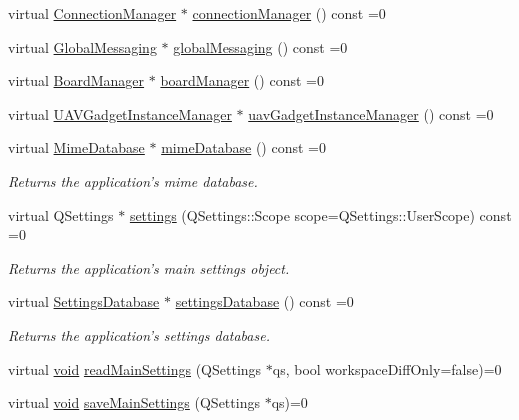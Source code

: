 \begin{DoxyCompactItemize}
virtual \hyperlink{class_core_1_1_connection_manager}{\-Connection\-Manager} $\ast$ \hyperlink{group___core_plugin_gab606d10ae8f0f9575d0e8ffb6e776ac7}{connection\-Manager} () const =0
\item 
virtual \hyperlink{class_core_1_1_global_messaging}{\-Global\-Messaging} $\ast$ \hyperlink{group___core_plugin_ga90d4f12b990192d622c2f164d577ebf3}{global\-Messaging} () const =0
\item 
virtual \hyperlink{class_core_1_1_board_manager}{\-Board\-Manager} $\ast$ \hyperlink{group___core_plugin_ga01532acba71e5af5bee3777209aebf7d}{board\-Manager} () const =0
\item 
virtual \hyperlink{class_core_1_1_u_a_v_gadget_instance_manager}{\-U\-A\-V\-Gadget\-Instance\-Manager} $\ast$ \hyperlink{group___core_plugin_ga6aeba1dab852cf7c211cc2405f124ee7}{uav\-Gadget\-Instance\-Manager} () const =0
\item 
virtual \hyperlink{class_core_1_1_mime_database}{\-Mime\-Database} $\ast$ \hyperlink{group___core_plugin_gac1e3260fb816ebaae2c4dc7cffbee93a}{mime\-Database} () const =0
\begin{DoxyCompactList}\small\item\em \-Returns the application's mime database. \end{DoxyCompactList}\item 
virtual \-Q\-Settings $\ast$ \hyperlink{group___core_plugin_gaa7af8fc52c8c8453fe27ab7105a594d2}{settings} (\-Q\-Settings\-::\-Scope scope=\-Q\-Settings\-::\-User\-Scope) const =0
\begin{DoxyCompactList}\small\item\em \-Returns the application's main settings object. \end{DoxyCompactList}\item 
virtual \hyperlink{class_core_1_1_settings_database}{\-Settings\-Database} $\ast$ \hyperlink{group___core_plugin_ga70be5be626fe168da78ba7a0ae383236}{settings\-Database} () const =0
\begin{DoxyCompactList}\small\item\em \-Returns the application's settings database. \end{DoxyCompactList}\item 
virtual \hyperlink{group___u_a_v_objects_plugin_ga444cf2ff3f0ecbe028adce838d373f5c}{void} \hyperlink{group___core_plugin_ga6328cac0278945d041c3813736c600b4}{read\-Main\-Settings} (\-Q\-Settings $\ast$qs, bool workspace\-Diff\-Only=false)=0
\item 
virtual \hyperlink{group___u_a_v_objects_plugin_ga444cf2ff3f0ecbe028adce838d373f5c}{void} \hyperlink{group___core_plugin_ga06a863277f61ed94785263617433add1}{save\-Main\-Settings} (\-Q\-Settings $\ast$qs)=0

\end{DoxyCompactItemize}
